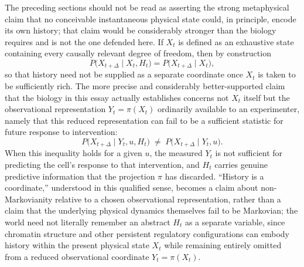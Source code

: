 \documentclass[11pt]{article}
\begin{document}
The preceding sections should not be read as asserting the strong metaphysical claim that no conceivable instantaneous physical state could, in principle, encode its own history; that claim would be considerably stronger than the biology requires and is not the one defended here. If $X_t$ is defined as an exhaustive state containing every causally relevant degree of freedom, then by construction
\begin{equation}
P\bigl(X_{t+\Delta} \mid X_t, H_t\bigr) = P\bigl(X_{t+\Delta} \mid X_t\bigr),
\end{equation}
so that history need not be supplied as a separate coordinate once $X_t$ is taken to be sufficiently rich. The more precise and considerably better-supported claim that the biology in this essay actually establishes concerns not $X_t$ itself but the observational representation $Y_t = \pi(X_t)$ ordinarily available to an experimenter, namely that this reduced representation can fail to be a sufficient statistic for future response to intervention:
\begin{equation}
P\bigl(X_{t+\Delta} \mid Y_t, u, H_t\bigr) \;\neq\; P\bigl(X_{t+\Delta} \mid Y_t, u\bigr).
\end{equation}
When this inequality holds for a given $u$, the measured $Y_t$ is not sufficient for predicting the cell's response to that intervention, and $H_t$ carries genuine predictive information that the projection $\pi$ has discarded. ``History is a coordinate,'' understood in this qualified sense, becomes a claim about non-Markovianity relative to a chosen observational representation, rather than a claim that the underlying physical dynamics themselves fail to be Markovian; the world need not literally remember an abstract $H_t$ as a separate variable, since chromatin structure and other persistent regulatory configurations can embody history within the present physical state $X_t$ while remaining entirely omitted from a reduced observational coordinate $Y_t = \pi(X_t)$.
\end{document}
